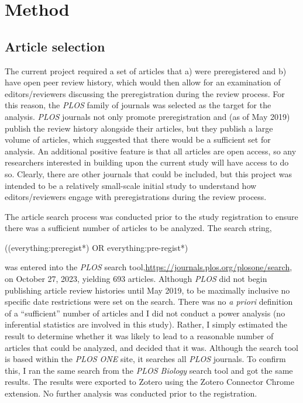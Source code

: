 \documentclass[authordate, empirical]{jote-new-article}
\begin{document}
	\section{\textbf{Method}}



	\subsection{Article selection}



	The current project required a set of articles that a) were preregistered and b) have open peer review history, which would then allow for an examination of editors/reviewers discussing the preregistration during the review process. For this reason, the \emph{PLOS} family of journals was selected as the target for the analysis. \emph{PLOS} journals not only promote preregistration and (as of May 2019) publish the review history alongside their articles, but they publish a large volume of articles, which suggested that there would be a sufficient set for analysis. An additional positive feature is that all articles are open access, so any researchers interested in building upon the current study will have access to do so. Clearly, there are other journals that could be included, but this project was intended to be a relatively small-scale initial study to understand how editors/reviewers engage with preregistrations during the review process.



	The article search process was conducted prior to the study registration to ensure there was a sufficient number of articles to be analyzed. The search string,



	((everything:preregist*) OR everything:pre-regist*)



	was entered into the \emph{PLOS} search tool,\url{https://journals.plos.org/plosone/search}, on October 27, 2023, yielding 693 articles. Although \emph{PLOS} did not begin publishing article review histories until May 2019, to be maximally inclusive no specific date restrictions were set on the search. There was no \emph{a priori} definition of a “sufficient” number of articles and I did not conduct a power analysis (no inferential statistics are involved in this study). Rather, I simply estimated the result to determine whether it was likely to lead to a reasonable number of articles that could be analyzed, and decided that it was. Although the search tool is based within the \emph{PLOS ONE} site, it searches all \emph{PLOS} journals. To confirm this, I ran the same search from the \emph{PLOS Biology} search tool and got the same results. The results were exported to Zotero using the Zotero Connector Chrome extension. No further analysis was conducted prior to the registration.
\end{document}

